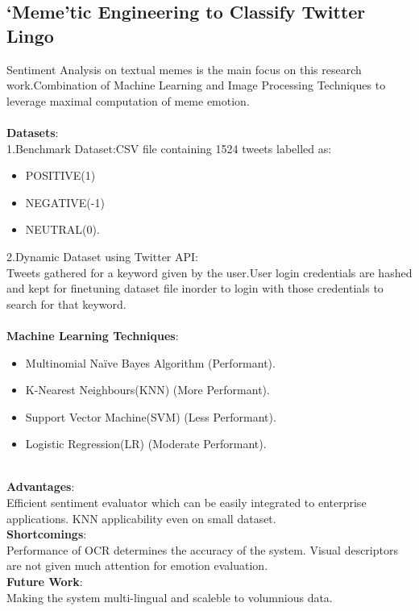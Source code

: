 \documentclass[12pt,a4paper]{article}
\begin{document}
\subsection{‘Meme’tic Engineering to Classify Twitter Lingo\cite{memeticEnggTwitter}}
Sentiment Analysis on textual memes is the main focus on this research work.Combination of Machine Learning and Image Processing Techniques to leverage maximal computation of meme emotion.\\~\\
\textbf{Datasets}:\\
1.Benchmark
Dataset:CSV file containing 1524 tweets labelled as:\\
\begin{itemize}
	\item POSITIVE(1)\\
	\item NEGATIVE(-1)\\
	\item NEUTRAL(0).
\end{itemize}
2.Dynamic Dataset using Twitter API:\\
Tweets gathered for a keyword given by the user.User login credentials are hashed and kept for finetuning dataset file inorder to login with those credentials to search for that keyword. \\~\\
\textbf{Machine Learning Techniques}:\\
\begin{itemize}
\item Multinomial Na\"ive Bayes Algorithm (Performant).\\
\item K-Nearest Neighbours(KNN) (More Performant).\\
\item Support Vector Machine(SVM) (Less Performant).\\
\item Logistic Regression(LR) (Moderate Performant).\\~\\
\end{itemize}
\textbf{Advantages}:\\
Efficient sentiment evaluator which can be
	easily integrated to enterprise applications.
KNN applicability even on small dataset.\\
\textbf{Shortcomings}:\\
Performance of OCR determines the accuracy of the system.
Visual descriptors are not given much attention for emotion evaluation.\\
\textbf{Future Work}:\\
Making the system multi-lingual and scaleble to volumnious data. 
\end{document}
